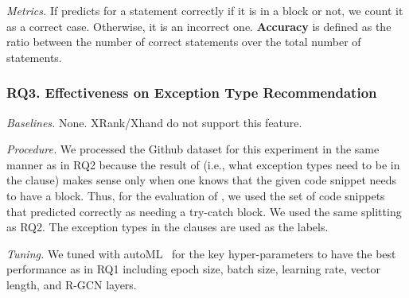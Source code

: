 
{\em Metrics.} If {\xstate} predicts for a statement correctly if it
is in a  block or not, we count it as a correct case.
Otherwise, it is an incorrect one. \textbf{Accuracy} is
defined as the ratio between the number of correct statements over the
total number of statements.


\subsubsection{RQ3. Effectiveness on Exception Type Recommendation\\}

{\em Baselines.} None. XRank/Xhand do not support this feature.


{\em Procedure.} We processed the Github dataset for this experiment
in the same manner as in RQ2 because the result of {\xtype} (i.e.,
what exception types need to be in the  clause) makes
sense only when one knows that the given code snippet needs to have a
 block. Thus, for the evaluation of {\xtype}, we used
the set of code snippets that {\xblock} predicted correctly as needing
a try-catch block. We used the same splitting as RQ2. The exception
types in the  clauses are used as the labels.


{\em Tuning.} We tuned {\tool} with autoML~\cite{NNI} for the
key hyper-parameters to have the best performance as in RQ1 including
epoch size, batch size, learning rate, vector length, and R-GCN layers.

